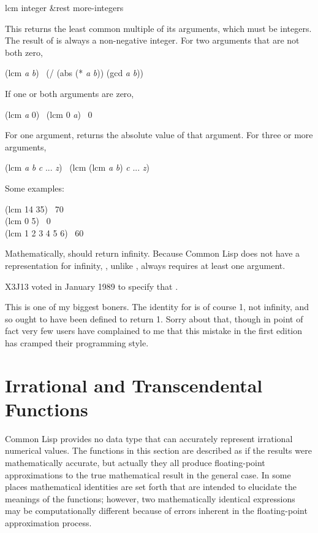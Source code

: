 \begin{defun}[Function]
lcm integer &rest more-integers

This returns the least common multiple of its arguments,
which must be integers.
The result of  is always a non-negative integer.
For two arguments that are not both zero,
\begin{lisp}
(lcm {\it a} {\it b}) \EQ\ (/ (abs (* {\it a} {\it b})) (gcd {\it a} {\it b}))
\end{lisp}
If one or both arguments are zero,
\begin{lisp}
(lcm {\it a} 0) \EQ\ (lcm 0 {\it a}) \EQ\ 0
\end{lisp}

For one argument,  returns the absolute value of that argument.
For three or more arguments,
\begin{lisp}
(lcm {\it a} {\it b} {\it c} ... {\it z}) \EQ\ (lcm (lcm {\it a} {\it b}) {\it c} ... {\it z})
\end{lisp}

Some examples:
\begin{lisp}
(lcm 14 35) \EV\ 70 \\
(lcm 0 5) \EV\ 0 \\
(lcm 1 2 3 4 5 6) \EV\ 60
\end{lisp}

Mathematically,  should return infinity.  Because Common Lisp
does not have a representation for infinity, , unlike ,
always requires at least one argument.

\begin{new}
X3J13 voted in January 1989
to specify that .

This is one of my biggest boners.  The identity for  is of course 1,
not infinity, and so  ought to have been defined to return 1.
Sorry about that, though in point of fact very few users have complained
to me that this mistake in the first edition has cramped their programming style.
\end{new}
\end{defun}

\section{Irrational and Transcendental Functions}
\label{TRANSCENDENTAL-SECTION}

Common Lisp provides no data type that can accurately represent irrational
numerical values.
The functions in this section are described as if the results
were mathematically accurate, but actually they all produce floating-point
approximations to the true mathematical result in the general case.
In some places
mathematical identities are set forth that are intended to elucidate the
meanings of the functions; however, two mathematically identical
expressions may be computationally different because of errors
inherent in the floating-point approximation process.

